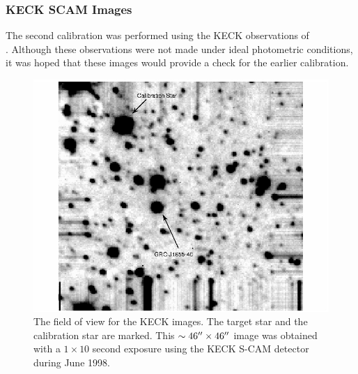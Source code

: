 
\subsubsection{KECK SCAM Images}
\label{cha:lightcurve:sec:Photometry:subsec:PhotometricCalibration:subsubsec:keck}

The second calibration was performed using the KECK observations of \\%
\groj. Although these observations were not made under ideal photometric conditions, it was hoped that these images would provide a check for the earlier calibration. %

\begin{figure}[!htb]
\begin{center}
\includegraphics[width=5.0in]{keck00_2}
\caption{%
The field of view for the KECK images. The target star and the
calibration star are marked. This $\sim 46\hbox{$^{\prime\prime}$} \times 46\hbox{$^{\prime\prime}$}$
image was obtained with a $1\times10$ second exposure using the KECK
S-CAM detector during June 1998. }
\label{cha:lightcurve:sec:Photometry:subsec:PhotometricCalibration:subsubsec:keck:fig:keck00_2}
\end{center}
\end{figure}

\vspace{\myparskip}

